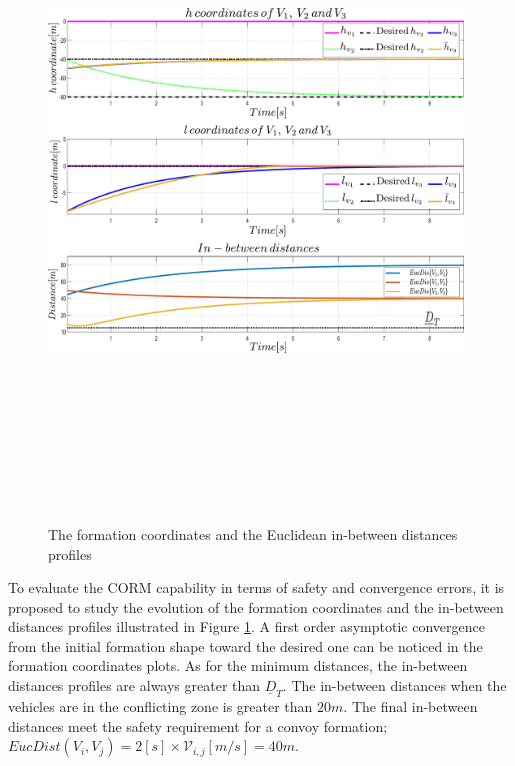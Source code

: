 \begin{enumerate}
        \begin{figure}[!h]
        \centering 
        \includegraphics[width=11cm,height=18cm,keepaspectratio]{chapters/Chapitre_5/Figures/CORM/In_between_distances.pdf}
        \caption{The formation coordinates and the Euclidean in-between distances profiles}
        \label{fig:CORM: formation_coordinates}
        \end{figure}

To evaluate the CORM capability in terms of safety and convergence errors, it is proposed to study the evolution of the formation coordinates and the in-between distances profiles illustrated in Figure \ref{fig:CORM: formation_coordinates}. A first order asymptotic convergence from the initial formation shape toward the desired one can be noticed in the formation coordinates plots. As for the minimum distances, the in-between distances profiles are always greater than $\underline{D}_T$. The in-between distances when the vehicles are in the conflicting zone is greater than  $20m$. The final in-between distances meet the safety requirement for a convoy formation; $EucDist(V_i, V_j)=2[s]\times \mathcal{V}_{i,j}[m/s]=40m$. 



\end{enumerate}
